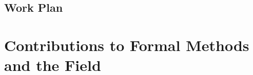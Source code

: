 


% 

\subsection{Work Plan}


\section{Contributions to Formal Methods and the Field}
\label{sec:contributions}



